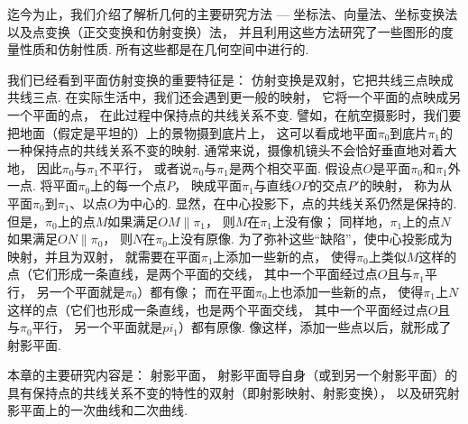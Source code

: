 迄今为止，我们介绍了解析几何的主要研究方法
--- 坐标法、向量法、坐标变换法以及点变换（正交变换和仿射变换）法，
并且利用这些方法研究了一些图形的度量性质和仿射性质.
所有这些都是在几何空间中进行的.

我们已经看到平面仿射变换的重要特征是：
仿射变换是双射，它把共线三点映成共线三点.
在实际生活中，我们还会遇到更一般的映射，
它将一个平面的点映成另一个平面的点，
在此过程中保持点的共线关系不变.
譬如，在航空摄影时，我们要把地面（假定是平坦的）上的景物摄到底片上，
这可以看成地平面\(\pi_0\)到底片\(\pi_1\)的一种保持点的共线关系不变的映射.
通常来说，摄像机镜头不会恰好垂直地对着大地，
因此\(\pi_0\)与\(\pi_1\)不平行，
或者说\(\pi_0\)与\(\pi_1\)是两个相交平面.
假设点\(O\)是平面\(\pi_0\)和\(\pi_1\)外一点.
将平面\(\pi_0\)上的每一个点\(P\)，
映成平面\(\pi_1\)与直线\(OP\)的交点\(P'\)的映射，
称为从平面\(\pi_0\)到\(\pi_1\)、以点\(O\)为中心的.
显然，在中心投影下，点的共线关系仍然是保持的.
但是，\(\pi_0\)上的点\(M\)如果满足\(OM \parallel \pi_1\)，
则\(M\)在\(\pi_1\)上没有像；
同样地，\(\pi_1\)上的点\(N\)如果满足\(ON \parallel \pi_0\)，
则\(N\)在\(\pi_0\)上没有原像.
为了弥补这些“缺陷”，使中心投影成为映射，并且为双射，
就需要在平面\(\pi_1\)上添加一些新的点，
使得\(\pi_0\)上类似\(M\)这样的点（它们形成一条直线，是两个平面的交线，
其中一个平面经过点\(O\)且与\(\pi_1\)平行，
另一个平面就是\(\pi_0\)）都有像；
而在平面\(\pi_0\)上也添加一些新的点，
使得\(\pi_1\)上\(N\)这样的点（它们也形成一条直线，也是两个平面交线，
其中一个平面经过点\(O\)且与\(\pi_0\)平行，
另一个平面就是\(pi_1\)）都有原像.
像这样，添加一些点以后，就形成了射影平面.

本章的主要研究内容是：
射影平面，
射影平面导自身（或到另一个射影平面）的具有保持点的共线关系不变的特性的双射（即射影映射、射影变换），
以及研究射影平面上的一次曲线和二次曲线.
